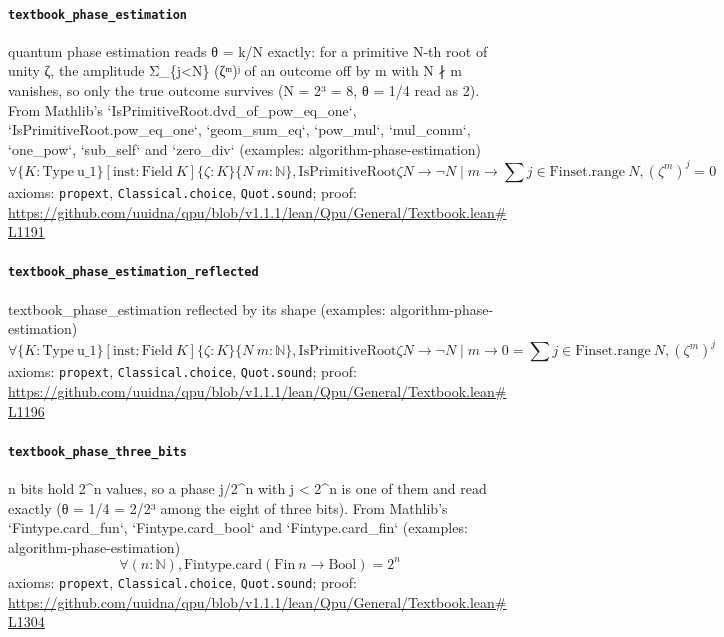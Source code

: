 \documentclass[11pt]{article}
\begin{document}
\paragraph{\texttt{textbook\_phase\_estimation}}
quantum phase estimation reads θ = k/N exactly: for a primitive N-th root of unity ζ, the amplitude Σ\_\{j<N\} (ζᵐ)ʲ of an outcome off by m with N ∤ m vanishes, so only the true outcome survives (N = 2³ = 8, θ = 1/4 read as 2). From Mathlib's `IsPrimitiveRoot.dvd\_of\_pow\_eq\_one`, `IsPrimitiveRoot.pow\_eq\_one`, `geom\_sum\_eq`, `pow\_mul`, `mul\_comm`, `one\_pow`, `sub\_self` and `zero\_div` (examples: algorithm-phase-estimation)
\[ \forall \{K : \mathrm{Type}\ \mathrm{u\_1}\} [\mathrm{inst} : \mathrm{Field}\ K] \{\zeta : K\} \{N\ m : \mathbb{N}\}, \mathrm{IsPrimitiveRoot} \zeta N \to \neg N \mid m \to \sum j \in \mathrm{Finset.range}\ N, (\zeta ^{m}) ^{j} = 0 \]
\noindent axioms: \texttt{propext}, \texttt{Classical.choice}, \texttt{Quot.sound}; proof: \url{https://github.com/uuidna/qpu/blob/v1.1.1/lean/Qpu/General/Textbook.lean\#L1191}

\paragraph{\texttt{textbook\_phase\_estimation\_reflected}}
textbook\_phase\_estimation reflected by its shape (examples: algorithm-phase-estimation)
\[ \forall \{K : \mathrm{Type}\ \mathrm{u\_1}\} [\mathrm{inst} : \mathrm{Field}\ K] \{\zeta : K\} \{N\ m : \mathbb{N}\}, \mathrm{IsPrimitiveRoot} \zeta N \to \neg N \mid m \to 0 = \sum j \in \mathrm{Finset.range}\ N, (\zeta ^{m}) ^{j} \]
\noindent axioms: \texttt{propext}, \texttt{Classical.choice}, \texttt{Quot.sound}; proof: \url{https://github.com/uuidna/qpu/blob/v1.1.1/lean/Qpu/General/Textbook.lean\#L1196}

\paragraph{\texttt{textbook\_phase\_three\_bits}}
n bits hold 2\^{}n values, so a phase j/2\^{}n with j < 2\^{}n is one of them and read exactly (θ = 1/4 = 2/2³ among the eight of three bits). From Mathlib's `Fintype.card\_fun`, `Fintype.card\_bool` and `Fintype.card\_fin` (examples: algorithm-phase-estimation)
\[ \forall (n : \mathbb{N}), \mathrm{Fintype.card} (\mathrm{Fin}\ n \to \mathrm{Bool}) = 2 ^{n} \]
\noindent axioms: \texttt{propext}, \texttt{Classical.choice}, \texttt{Quot.sound}; proof: \url{https://github.com/uuidna/qpu/blob/v1.1.1/lean/Qpu/General/Textbook.lean\#L1304}
\end{document}
